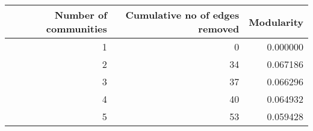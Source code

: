 \begin{tabular}{rrr}
\toprule
 Number of communities &  Cumulative no of edges removed &  Modularity \\
\midrule
                     1 &                               0 &    0.000000 \\
                     2 &                              34 &    0.067186 \\
                     3 &                              37 &    0.066296 \\
                     4 &                              40 &    0.064932 \\
                     5 &                              53 &    0.059428 \\
\bottomrule
\end{tabular}
